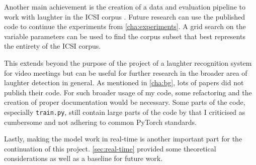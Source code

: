 \documentclass[bsc,frontabs,parskip,deptreport]{infthesis}
\begin{document}
Another main achievement is the creation of a data and evaluation pipeline to work with laughter in the ICSI corpus \citep{morgan2001meeting}. 
Future research can use the published code \citep{Wolter_A_Machine_Learning_2022} to continue the experiments from \autoref{cha:experiments}. A grid search on the variable parameters can be used to find the corpus subset that best represents the entirety of the ICSI corpus. 

This extends beyond the purpose of the project of a laughter recognition system for video meetings but can be useful for further research in the broader area of laughter detection in general. 
As mentioned in \autoref{cha:bg}, lots of papers did not publish their code.
For such broader usage of my code, some refactoring and the creation of proper documentation would be necessary.
Some parts of the code, especially \verb|train.py|, still contain large parts of the code by \citet{gillick2021robust} that I criticised as cumbersome and not adhering to common PyTorch standards. 

Lastly, making the model work in real-time is another important part for the continuation of this project. \autoref{sec:real-time} provided some theoretical considerations as well as a baseline for future work.


\end{document}
